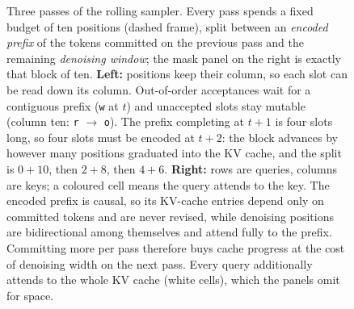 \begin{figure}[tbp]
\caption{Three passes of the rolling sampler.  Every pass spends a fixed
budget of ten positions (dashed frame), split between an \emph{encoded
prefix} of the tokens committed on the previous pass and the remaining
\emph{denoising window}; the mask panel on the right is exactly that block of
ten.  \textbf{Left:} positions keep their column, so each slot can be read down
its column.  Out-of-order acceptances wait for a contiguous prefix (\texttt{w}
at $t$) and unaccepted slots stay mutable (column ten: \texttt{r} $\to$
\texttt{o}).  The prefix completing at $t{+}1$ is four slots long, so four
slots must be encoded at $t{+}2$: the block advances by however many positions
graduated into the KV cache, and the split is $0{+}10$, then $2{+}8$, then
$4{+}6$.  \textbf{Right:} rows are queries, columns are keys; a coloured cell
means the query attends to the key.  The encoded prefix is causal, so its
KV-cache entries depend only on committed tokens and are never revised, while
denoising positions are bidirectional among themselves and attend fully to the
prefix.  Committing more per pass therefore buys cache progress at the cost of
denoising width on the next pass.  Every query additionally attends to the
whole KV cache (white cells), which the panels omit for space.}
\label{fig:algorithm-concept}
\end{figure}